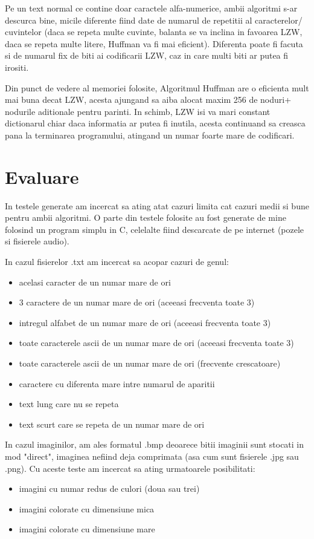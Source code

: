 \documentclass[runningheads]{llncs}
\begin{document}
Pe un text normal ce contine doar caractele alfa-numerice, ambii algoritmi s-ar descurca bine, micile diferente fiind date de numarul de repetitii al caracterelor/ cuvintelor (daca se repeta
multe cuvinte, balanta se va inclina in favoarea LZW, daca se repeta multe litere, Huffman va fi mai eficient). Diferenta poate fi facuta si de numarul fix de biti ai
codificarii LZW, caz in care multi biti ar putea fi irositi.

Din punct de vedere al memoriei folosite, Algoritmul Huffman are o eficienta mult mai buna decat LZW, acesta ajungand sa aiba alocat maxim 256 de noduri+ nodurile aditionale pentru parinti.
In schimb, LZW isi va mari constant dictionarul chiar daca informatia ar putea fi inutila, acesta continuand sa creasca pana la terminarea programului, atingand un numar foarte mare de codificari.


\section{Evaluare}

In testele generate am incercat sa ating atat cazuri limita cat cazuri medii si bune pentru ambii algoritmi.
O parte din testele folosite au fost generate de mine folosind un program simplu in C, celelalte fiind descarcate de pe internet (pozele si fisierele audio).

In cazul fisierelor .txt am incercat sa acopar cazuri de genul:
\begin{itemize}
    \item acelasi caracter de un numar mare de ori
    \item 3 caractere de un numar mare de ori (aceeasi frecventa toate 3)
    \item intregul alfabet de un numar mare de ori (aceeasi frecventa toate 3)
    \item toate caracterele ascii de un numar mare de ori (aceeasi frecventa toate 3)
    \item toate caracterele ascii de un numar mare de ori (frecvente crescatoare)
    \item caractere cu diferenta mare intre numarul de aparitii
    \item text lung care nu se repeta 
    \item text scurt care se repeta de un numar mare de ori
\end{itemize}

In cazul imaginilor, am ales formatul .bmp deoarece bitii imaginii sunt stocati in mod "direct", imaginea nefiind deja comprimata (asa cum sunt fisierele .jpg sau .png).
Cu aceste teste am incercat sa ating urmatoarele posibilitati:
\begin{itemize}
    \item imagini cu numar redus de culori (doua sau trei)
    \item imagini colorate cu dimensiune mica
    \item imagini colorate cu dimensiune mare
\end{itemize}
\end{document}
